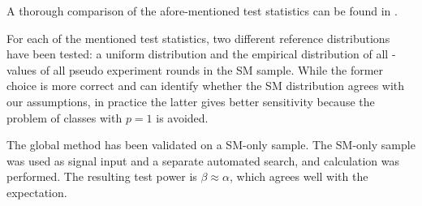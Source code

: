 A thorough comparison of the afore-mentioned test statistics can be found in \cite{Stephens:EDFstatisticsgoodness}.

For each of the mentioned test statistics, two different reference distributions have been tested: a uniform distribution and the empirical distribution of all \ptilde-values of all pseudo experiment rounds in the \ac{SM} sample.
While the former choice is more correct and can identify whether the \ac{SM} distribution agrees with our assumptions, in practice the latter gives better sensitivity because the problem of classes with $p=1$ is avoided.

The global method has been validated on a \ac{SM}-only sample. The \ac{SM}-only sample was used as signal input and a separate automated search, \ptilde and \phat calculation was performed. 
The resulting test power is $\beta \approx \alpha$, which agrees well with the expectation.


%
%
%
%
%
%
%
%
%
%
%
